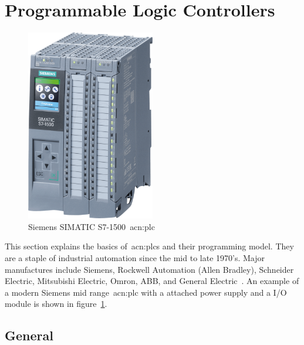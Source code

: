 \section{Programmable Logic Controllers}
\label{sec:plc}

 
\begin{figure}
    \centering
    \includegraphics[width=0.5\textwidth]{Figures/simatic_s7-1500.png}
    \caption[Siemens SIMATIC S7-1500]{Siemens SIMATIC S7-1500~\acrshort{acn:plc}~\cite{Reichelt:2020}}
    \label{fig:simatic_s7}
\end{figure}

This section explains the basics of~\glspl{acn:plc} and their programming model.
They are a staple of industrial automation since the mid to late 1970's.
Major manufactures include Siemens, Rockwell Automation (Allen Bradley), Schneider Electric, Mitsubishi Electric, Omron, ABB, and General Electric~\cite{Businesswire:2016}.
An example of a modern Siemens mid range~\acrshort{acn:plc} with a attached power supply and a I/O module is shown in figure~\ref{fig:simatic_s7}.

\subsection{General}

